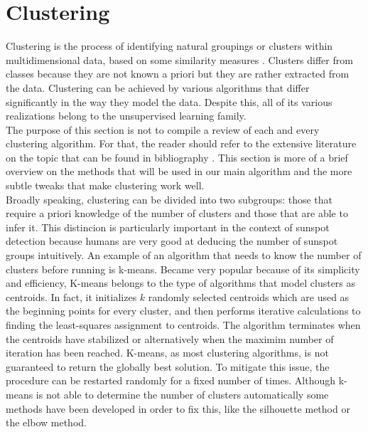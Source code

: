 \section{Clustering}
Clustering is the process of identifying natural groupings or clusters within multidimensional data, based on some similarity measures \cite{omran2007overview}. Clusters differ from classes because they are not known a priori but they are rather extracted from the data. Clustering can be achieved by various algorithms that differ significantly in the way they model the data. Despite this, all of its various realizations belong to the unsupervised learning family. \\
The purpose of this section is not to compile a review of each and every clustering algorithm. For that, the reader should refer to the extensive literature on the topic that can be found in bibliography \cite{omran2007overview}\cite{jain1999data}. This section is more of a brief overview on the methods that will be used in our main algorithm and the more subtle tweaks that make clustering work well.\\
Broadly speaking, clustering can be divided into two subgroups: those that require a priori knowledge of the number of clusters and those that are able to infer it. This distincion is particularly important in the context of sunspot detection because humans are very good at deducing the number of sunspot groups intuitively. An example of an algorithm that needs to know the number of clusters before running is k-means. Became very popular because of its simplicity and efficiency, K-means belongs to the type of algorithms that model clusters as centroids. In fact, it initializes $k$ randomly selected centroids which are used as the beginning points for every cluster, and then performs iterative calculations to finding the least-squares assignment to centroids. The algorithm terminates when the centroids have stabilized or alternatively when the maximim number of iteration has been reached. K-means, as most clustering algorithms, is not guaranteed to return the globally best solution. To mitigate this issue, the procedure can be restarted randomly for a fixed number of times. Although k-means is not able to determine the number of clusters automatically some methods have been developed in order to fix this, like the silhouette method \cite{rousseeuw1987silhouettes} or the elbow method.
